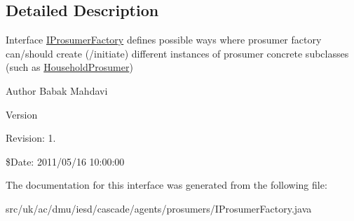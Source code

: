 \subsection{Detailed Description}
Interface \hyperlink{interfaceuk_1_1ac_1_1dmu_1_1iesd_1_1cascade_1_1agents_1_1prosumers_1_1_i_prosumer_factory}{I\-Prosumer\-Factory} defines possible ways where prosumer factory can/should create (/initiate) different instances of prosumer concrete subclasses (such as {\ttfamily \hyperlink{classuk_1_1ac_1_1dmu_1_1iesd_1_1cascade_1_1agents_1_1prosumers_1_1_household_prosumer}{Household\-Prosumer}}) 

\begin{DoxyAuthor}{Author}
Babak Mahdavi 
\end{DoxyAuthor}
\begin{DoxyVersion}{Version}

\end{DoxyVersion}
\begin{DoxyParagraph}{Revision\-:}
1. 
\end{DoxyParagraph}
\$\-Date\-: 2011/05/16 10\-:00\-:00 

The documentation for this interface was generated from the following file\-:\begin{DoxyCompactItemize}
\item 
src/uk/ac/dmu/iesd/cascade/agents/prosumers/I\-Prosumer\-Factory.\-java\end{DoxyCompactItemize}
